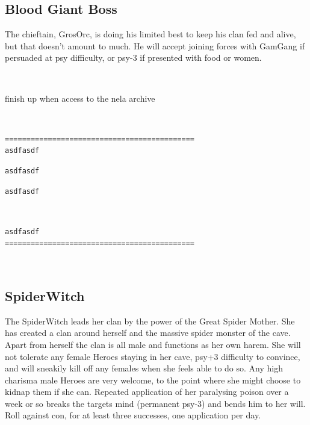 \goodbreak
\subsection*{Blood Giant Boss}

The chieftain, GrosOrc, is doing his limited best to keep his clan fed and alive, but that doesn't amount to much. He will accept joining forces with GamGang if persuaded at psy difficulty, or psy-3 if presented with food or women.

\

\todo finish up when access to the nela archive

\

\small \begin{samepage} \begin{verbatim}
============================================
asdfasdf
\end{verbatim} \end{samepage} \begin{samepage} \begin{verbatim}
asdfasdf
\end{verbatim} \goodbreak \begin{verbatim}
asdfasdf
\end{verbatim} \end{samepage}   \   \goodbreak \begin{samepage} \begin{verbatim}
asdfasdf
============================================
\end{verbatim} \end{samepage} \normalsize





\

\goodbreak 
\subsection*{SpiderWitch}
\label{spiderwitch}

The SpiderWitch leads her clan by the power of the Great Spider Mother. She has created a clan around herself and the massive spider monster of the cave. Apart from herself the clan is all male and functions as her own harem. She will not tolerate any female Heroes staying in her cave, psy+3 difficulty to convince, and will sneakily kill off any females when she feels able to do so. Any high charisma male Heroes are very welcome, to the point where she might choose to kidnap them if she can. Repeated application of her paralysing poison over a week or so breaks the targets mind (permanent psy-3) and bends him to her will. Roll against con, for at least three successes, one application per day.

